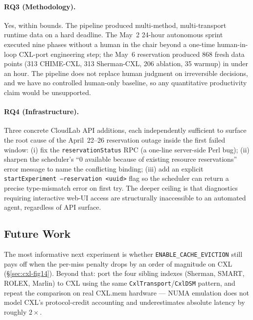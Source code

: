 \documentclass[11pt,a4paper]{article}
\begin{document}
\paragraph{RQ3 (Methodology).} Yes, within bounds. The pipeline produced multi-method, multi-transport runtime data on a hard deadline. The May~2 24-hour autonomous sprint executed nine phases without a human in the chair beyond a one-time human-in-loop CXL-port engineering step; the May~6 reservation produced 868 fresh data points (313 CHIME-CXL, 313 Sherman-CXL, 206 ablation, 35 warmup) in under an hour. The pipeline does not replace human judgment on irreversible decisions, and we have no controlled human-only baseline, so any quantitative productivity claim would be unsupported.

\paragraph{RQ4 (Infrastructure).} Three concrete CloudLab API additions, each independently sufficient to surface the root cause of the April~22--26 reservation outage inside the first failed window: (i) fix the \texttt{reservationStatus} RPC (a one-line server-side Perl bug); (ii) sharpen the scheduler's ``0 available because of existing resource reservations'' error message to name the conflicting binding; (iii) add an explicit \texttt{startExperiment --reservation <uuid>} flag so the scheduler can return a precise type-mismatch error on first try. The deeper ceiling is that diagnostics requiring interactive web-UI access are structurally inaccessible to an automated agent, regardless of API surface.

\subsection{Future Work}

The most informative next experiment is whether \texttt{ENABLE\_CACHE\_EVICTION} still pays off when the per-miss penalty drops by an order of magnitude on CXL (\S\ref{sec:cxl-fig14}). Beyond that: port the four sibling indexes (Sherman, SMART, ROLEX, Marlin) to CXL using the same \texttt{CxlTransport}/\texttt{CxlDSM} pattern, and repeat the comparison on real CXL.mem hardware --- NUMA emulation does not model CXL's protocol-credit accounting and underestimates absolute latency by roughly $2\times$.



\end{document}

